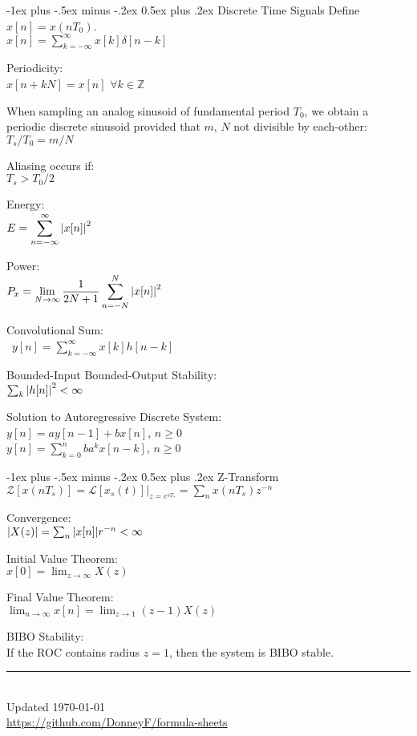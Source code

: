 \documentclass[12pt,landscape,letterpaper]{article}
\makeatletter
\renewcommand{\section}{\@startsection{section}{1}{0mm}%
                                {-1ex plus -.5ex minus -.2ex}%
                                {0.5ex plus .2ex}%
                                {\normalfont\normalsize\bfseries}}
\newcommand{\tabm}{\hspace*{0.07\textwidth}}
\newcommand{\ds}{\displaystyle}
\makeatother
\begin{document}
\begin{minipage}[t]{0.27\textwidth}
\section{Discrete Time Signals}
\tabm Define $x[n] = x(nT_0)$.\\
\tabm $x[n] = \sum_{k=-\infty}^{\infty}x[k]\delta[n-k]$

Periodicity:\\
\tabm $x[n + kN] = x[n]$ \qquad $\forall k\in \mathbb{Z}$

When sampling an analog sinusoid of fundamental period $T_0$, we obtain a periodic discrete sinusoid provided that $m$, $N$ not divisible by each-other:\\
\tabm $T_s/T_0 = m/N$

Aliasing occurs if:\\
\tabm $T_s > T_0/2$

Energy:\\
\tabm $\ds E = \sum_{n = -\infty}^{\infty}\abs{x[n]}^2$

Power:\\
\tabm $\ds P_x = \lim_{N \rightarrow \infty}\frac{1}{2N + 1}\sum_{n= -N}^{N}\abs{x[n]}^2$

Convolutional Sum:\\\
\tabm $\ds y[n] = \sum_{k = -\infty}^{\infty} x[k]h[n-k]$

Bounded-Input Bounded-Output Stability:\\
\tabm $\sum_k \abs{h[n]}^2 < \infty$

Solution to Autoregressive Discrete System:\\
\tabm $y[n] = ay[n-1] + bx[n]$, $n \geq 0$\\
\tabm $y[n] = \sum_{k=0}^{n} ba^kx[n-k]$, $n\geq 0$

\section{Z-Transform}
\tabm $\mathcal{Z}[x(nT_s)] = \mathcal{L}[x_s(t)]\rvert_{z=e^{sT_s}} = \sum_n x(nT_s)z^{-n}$

Convergence:\\
\tabm $|X(z)| = \sum_n \abs{x[n]}r^{-n} < \infty$

Initial Value Theorem:\\
\tabm $\ds x[0] = \lim_{z\rightarrow \infty}X(z)$

Final Value Theorem:\\
\tabm $\ds \lim_{n\rightarrow \infty}x[n] = \lim_{z\rightarrow 1}(z-1)X(z)$

BIBO Stability:\\
\tabm If the ROC contains radius $z=1$, then the system is BIBO stable.

\rule{0.3\linewidth}{0.25pt}
\scriptsize\\
Updated \today\\
\href{https://github.com/DonneyF/formula-sheets}{https://github.com/DonneyF/formula-sheets}
\end{minipage}%
\end{document}
